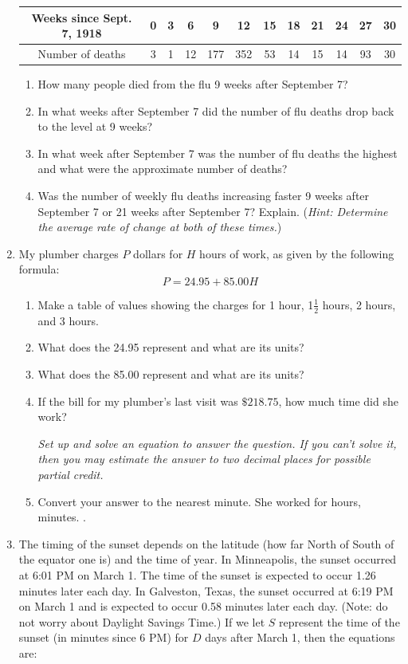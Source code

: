 \documentclass[12pt]{article}
\begin{document}
\begin{enumerate}
\begin{tabular} {|c|c|c|c|c |c|c|c|c|c |c|c|} \hline
Weeks since Sept. 7, 1918 & 0 & 3 & 6  & 9  & 12  & 15  & 18 & 21  & 24  & 27  & 30 \\ \hline
Number of deaths &3 & 1 & 12 & 177 & 352 & 53 & 14 & 15 & 14 & 93 & 30 \\ \hline
\end{tabular}

\begin{enumerate}
\item How many people died from the flu 9 weeks after September 7?
\vfill
\item In what weeks after September 7 did the number of flu deaths drop back to the level at 9 weeks?
\vfill
\item In what week after September 7 was the number of flu deaths the highest and what were the approximate number of deaths?
\vfill
\item Was the number of weekly flu deaths increasing faster 9 weeks after September 7 or 21 weeks after September 7?  Explain. (\emph{Hint: Determine the average rate of change at both of these times.})
\vfill
\end{enumerate}

\newpage %

\item My plumber charges $P$ dollars for $H$ hours of work, as given by the following formula:
$$P = 24.95 + 85.00H$$

\begin{enumerate}
\item Make a table of values showing the charges for 1 hour, 1$\frac{1}{2}$ hours, 2 hours, and 3 hours.
\vfill
\item What does the 24.95 represent and what are its units?
\vfill
\item What does the 85.00 represent and what are its units?
\vfill
\item If the bill for my plumber's last visit was $\$218.75$, how much time did she work?

\emph{Set up and solve an equation to answer the question.  If you can't solve it, then you may estimate the answer to two decimal places for possible partial credit.}
\vfill
\vfill
\vfill
\item Convert your answer to the nearest minute.
\vfill
She worked for \hrulefill hours, \hrulefill minutes. \hspace{3in}.
\end{enumerate}
\pagebreak
\item The timing of the sunset depends on the latitude (how far North of South of the equator one is) and the time of year.  In Minneapolis, the sunset occurred at 6:01 PM on March 1.  The time of the sunset is expected to occur 1.26 minutes later each day.  In Galveston, Texas, the sunset occurred at 6:19 PM on March 1 and is expected to occur 0.58 minutes later each day.  (Note: do not worry about Daylight Savings Time.) If we let $S$ represent the time of the sunset (in minutes since 6 PM) for $D$ days after March 1, then the equations are:


\end{enumerate}
\end{document}
